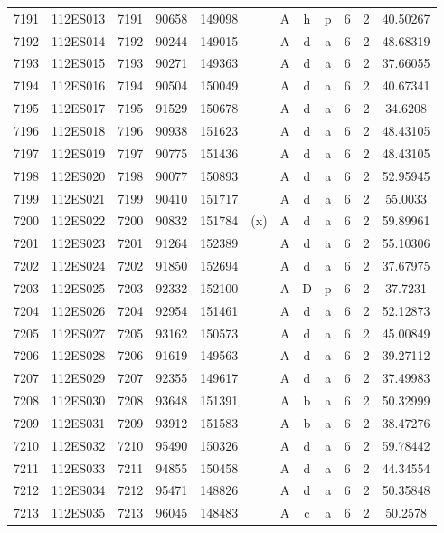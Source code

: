\begin{tabular}{|*{12}{c|}}
7191 & 112ES013 & 7191 & 90658 & 149098 &  & A & h & p & 6 & 2 & 40.50267 \\ 
7192 & 112ES014 & 7192 & 90244 & 149015 &  & A & d & a & 6 & 2 & 48.68319 \\ 
7193 & 112ES015 & 7193 & 90271 & 149363 &  & A & d & a & 6 & 2 & 37.66055 \\ 
7194 & 112ES016 & 7194 & 90504 & 150049 &  & A & d & a & 6 & 2 & 40.67341 \\ 
7195 & 112ES017 & 7195 & 91529 & 150678 &  & A & d & a & 6 & 2 & 34.6208 \\ 
7196 & 112ES018 & 7196 & 90938 & 151623 &  & A & d & a & 6 & 2 & 48.43105 \\ 
7197 & 112ES019 & 7197 & 90775 & 151436 &  & A & d & a & 6 & 2 & 48.43105 \\ 
7198 & 112ES020 & 7198 & 90077 & 150893 &  & A & d & a & 6 & 2 & 52.95945 \\ 
7199 & 112ES021 & 7199 & 90410 & 151717 &  & A & d & a & 6 & 2 & 55.0033 \\ 
7200 & 112ES022 & 7200 & 90832 & 151784 & (x) & A & d & a & 6 & 2 & 59.89961 \\ 
7201 & 112ES023 & 7201 & 91264 & 152389 &  & A & d & a & 6 & 2 & 55.10306 \\ 
7202 & 112ES024 & 7202 & 91850 & 152694 &  & A & d & a & 6 & 2 & 37.67975 \\ 
7203 & 112ES025 & 7203 & 92332 & 152100 &  & A & D & p & 6 & 2 & 37.7231 \\ 
7204 & 112ES026 & 7204 & 92954 & 151461 &  & A & d & a & 6 & 2 & 52.12873 \\ 
7205 & 112ES027 & 7205 & 93162 & 150573 &  & A & d & a & 6 & 2 & 45.00849 \\ 
7206 & 112ES028 & 7206 & 91619 & 149563 &  & A & d & a & 6 & 2 & 39.27112 \\ 
7207 & 112ES029 & 7207 & 92355 & 149617 &  & A & d & a & 6 & 2 & 37.49983 \\ 
7208 & 112ES030 & 7208 & 93648 & 151391 &  & A & b & a & 6 & 2 & 50.32999 \\ 
7209 & 112ES031 & 7209 & 93912 & 151583 &  & A & b & a & 6 & 2 & 38.47276 \\ 
7210 & 112ES032 & 7210 & 95490 & 150326 &  & A & d & a & 6 & 2 & 59.78442 \\ 
7211 & 112ES033 & 7211 & 94855 & 150458 &  & A & d & a & 6 & 2 & 44.34554 \\ 
7212 & 112ES034 & 7212 & 95471 & 148826 &  & A & d & a & 6 & 2 & 50.35848 \\ 
7213 & 112ES035 & 7213 & 96045 & 148483 &  & A & c & a & 6 & 2 & 50.2578 \\ 

\end{tabular}
